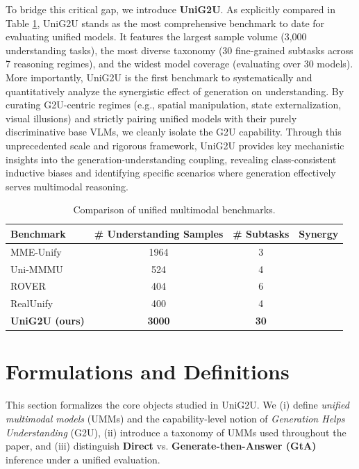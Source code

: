 \documentclass{article}
\theoremstyle{plain}
\theoremstyle{definition}
\theoremstyle{remark}
\newcommand{\cmark}{\textcolor{green!60!black}{\ding{51}}}
\newcommand{\xmark}{\textcolor{red!70!black}{\ding{55}}}
\begin{document}
To bridge this critical gap, we introduce \textbf{UniG2U}. As explicitly compared in Table \ref{tab:benchmark_compare}, UniG2U stands as the most comprehensive benchmark to date for evaluating unified models. It features the largest sample volume (3,000 understanding tasks), the most diverse taxonomy (30 fine-grained subtasks across 7 reasoning regimes), and the widest model coverage (evaluating over 30 models). More importantly, UniG2U is the first benchmark to systematically and quantitatively analyze the synergistic effect of generation on understanding. By curating G2U-centric regimes (e.g., spatial manipulation, state externalization, visual illusions) and strictly pairing unified models with their purely discriminative base VLMs, we cleanly isolate the G2U capability. Through this unprecedented scale and rigorous framework, UniG2U provides key mechanistic insights into the generation-understanding coupling, revealing class-consistent inductive biases and identifying specific scenarios where generation effectively serves multimodal reasoning.

\begin{table}[ht]
\centering
\caption{Comparison of unified multimodal benchmarks.}
\label{tab:benchmark_compare}
\footnotesize
\setlength{\tabcolsep}{5pt}
\begin{tabular}{lccc}
\toprule
Benchmark & \# Understanding Samples & \# Subtasks & Synergy \\
\midrule
MME-Unify & 1964 & 3 & \xmark \\
Uni-MMMU & 524 & 4 & \cmark \\
ROVER & 404 & 6 & \cmark \\
RealUnify & 400 & 4 & \cmark \\
\textbf{UniG2U (ours)} & \textbf{3000} & \textbf{30} & \textbf{\cmark} \\
\bottomrule
\end{tabular}
\end{table}




\section{Formulations and Definitions}
\label{sec:formulation}

This section formalizes the core objects studied in UniG2U.
We (i) define \emph{unified multimodal models} (UMMs) and the capability-level notion of \emph{Generation Helps Understanding} (G2U),
(ii) introduce a taxonomy of UMMs used throughout the paper, and
(iii) distinguish \textbf{Direct} vs.\textbf{ Generate-then-Answer (GtA)}  inference under a unified evaluation.
\end{document}
